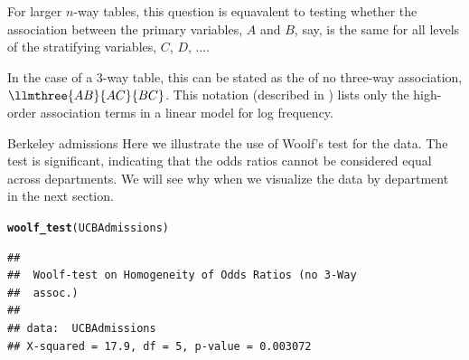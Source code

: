 \documentclass[11pt]{book}\usepackage[]{graphicx}\usepackage[]{color}
\makeatletter
\newcommand{\hlstd}[1]{\textcolor[rgb]{0.345,0.345,0.345}{#1}}%
\newcommand{\hlkwd}[1]{\textcolor[rgb]{0.737,0.353,0.396}{\textbf{#1}}}%
\newenvironment{kframe}{%
 \def\at@end@of@kframe{}%
 \ifinner\ifhmode%
  \def\at@end@of@kframe{\end{minipage}}%
  \begin{minipage}{\columnwidth}%
 \fi\fi%
 \def\FrameCommand##1{\hskip\@totalleftmargin \hskip-\fboxsep
 \colorbox{shadecolor}{##1}\hskip-\fboxsep
     \hskip-\linewidth \hskip-\@totalleftmargin \hskip\columnwidth}%
 \MakeFramed {\advance\hsize-\width
   \@totalleftmargin\z@ \linewidth\hsize
   \@setminipage}}%
 {\par\unskip\endMakeFramed%
 \at@end@of@kframe}
\newenvironment{knitrout}{}{} %
\renewenvironment{knitrout}{\small\renewcommand{\baselinestretch}{.85}}{} %
\makeatother
\begin{document}
For larger $n$-way tables,
this question is equavalent to testing whether the association
between the primary variables, $A$ and $B$, say, is the same for
all levels of the stratifying variables, $C$, $D$, $\dots$.

In the case of a 3-way table, this can be stated as the
 of no three-way association,
$\llmthree{AB}{AC}{BC}$.
This notation (described in )
lists only the high-order association
terms in a linear model for log frequency.

\begin{Example}[berkeley1a]{Berkeley admissions}
Here we illustrate the use of Woolf's test for the  data.
The test is significant, indicating that the odds ratios cannot be considered
equal across departments.  We will see why when we visualize the data
by department in the next section.
\begin{knitrout}
\color{fgcolor}\begin{kframe}
\begin{alltt}
\hlkwd{woolf_test}\hlstd{(UCBAdmissions)}
\end{alltt}
\begin{verbatim}
## 
## 	Woolf-test on Homogeneity of Odds Ratios (no 3-Way
## 	assoc.)
## 
## data:  UCBAdmissions
## X-squared = 17.9, df = 5, p-value = 0.003072
\end{verbatim}
\end{kframe}
\end{knitrout}


\end{Example}
\end{document}
